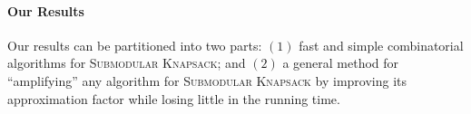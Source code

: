 \documentclass[a4paper,UKenglish,cleveref, autoref]{lipics-v2019}
\newcommand{\SK}{{\textsc{Submodular Knapsack}}\xspace}
\begin{document}


%
%

\paragraph*{Our Results}
Our results can be partitioned into two parts: $(1)$ fast and simple combinatorial algorithms for \SK; and $(2)$ a general method for ``amplifying'' any algorithm for \SK by improving its approximation factor while losing little in the running time.
\end{document}
